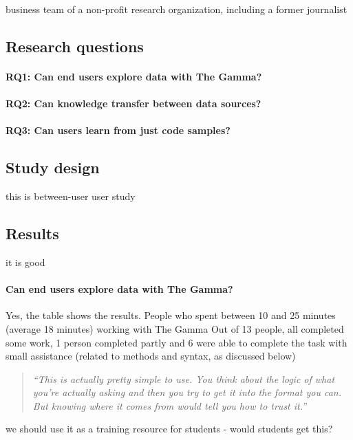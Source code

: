 \documentclass{sigchi}
\begin{document}
business team of a non-profit research organization, including a former journalist

\subsection{Research questions}

\paragraph{RQ1: Can end users explore data with The Gamma?}

\paragraph{RQ2: Can knowledge transfer between data sources?}

\paragraph{RQ3: Can users learn from just code samples?}

\subsection{Study design}
this is between-user user study

\subsection{Results}
it is good

\paragraph{Can end users explore data with The Gamma?}
Yes, the table shows the results.
People who spent between 10 and 25 minutes (average 18 minutes) working with The Gamma
Out of 13 people, all completed some work, 1 person completed partly and 6 were able
  to complete the task with small assistance (related to methods and syntax, as discussed below)

\begin{quote}
\emph{``This is actually pretty simple to use. You think about the logic of what you're actually asking and
    then you try to get it into the format you can. But knowing where it comes from would tell you how
    to trust it.''}
\end{quote}

we should use it as a training resource for students - would students get this?
\end{document}
